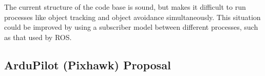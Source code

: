 \documentclass[a4paper, 11pt, titlepage]{article}
\begin{document}
  The current structure of the code base is sound, but makes it difficult to run processes like object tracking and object avoidance simultaneously.  This situation could be improved by using a subscriber model between different processes, such as that used by ROS.




  \pagebreak


\renewcommand{\refname}{References}


%

\printglossaries

\begin{appendices}




  \section{ArduPilot (Pixhawk) Proposal} \label{sec:PihawkProposal}
    

\end{appendices}

  
\end{document}
